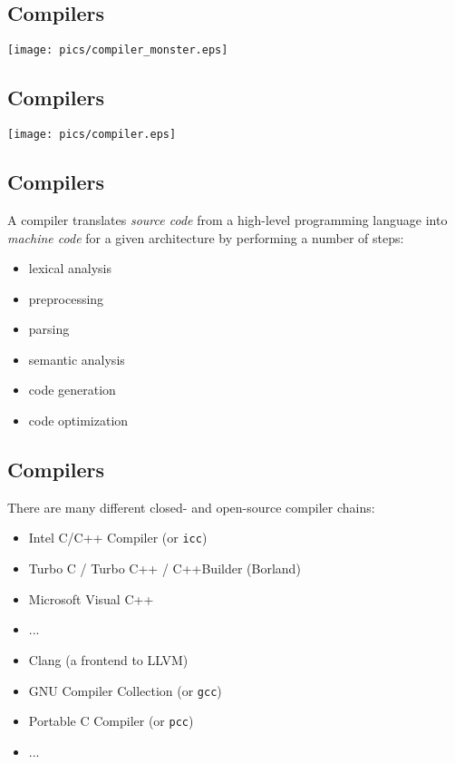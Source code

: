 \documentclass[xga]{xdvislides}
\begin{document}
\subsection{Compilers}

\begin{center}
	\texttt{[image: pics/compiler\_monster.eps]}
\end{center}


\subsection{Compilers}

\begin{center}
	\texttt{[image: pics/compiler.eps]}
\end{center}

\subsection{Compilers}

A compiler translates {\em source code} from a high-level programming
language into {\em machine code} for a given architecture by performing a
number of steps:

\begin{itemize}
	\item lexical analysis
	\item preprocessing
	\item parsing
	\item semantic analysis
	\item code generation
	\item code optimization
\end{itemize}


\subsection{Compilers}

There are many different closed- and open-source compiler chains:

\begin{itemize}
	\item Intel C/C++ Compiler (or \verb+icc+)
	\item Turbo C / Turbo C++ / C++Builder (Borland)
	\item Microsoft Visual C++
	\item ...
\\

	\item Clang (a frontend to LLVM)
	\item GNU Compiler Collection (or \verb+gcc+)
	\item Portable C Compiler (or \verb+pcc+)
	\item ...
\end{itemize}
\end{document}
